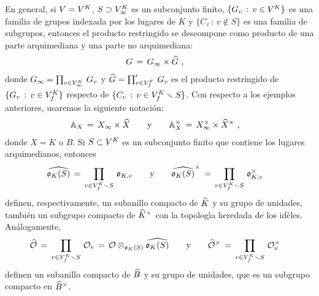 En general, si $V=\lugares{K}$, $S\supset\lugares[\infty]{K}$ es un subconjunto
finito, $\{G_{v}\,:\,v\in\lugares{K}\}$ es una familia de grupos indexada
por los lugares de $K$ y $\{C_{v}\,:\,v\not\in S\}$ es una familia de
subgrupos, entonces el producto restringido se descompone como producto de una
parte arquimediana y una parte no arquimediana:
\begin{align*}
	G & \,=\,\Adinf{G}\times \Adfin{G}
	\text{ ,}
\end{align*}
%
donde $\Adinf{G}=\prod_{v\in\lugares[\infty]{K}}\,G_{v}$ y
$\Adfin{G}=\prod_{v\in\lugares[f]{F}}'\,G_{v}$ es el producto restringido de
$\{G_{v}\,:\,v\in\lugares[f]{K}\}$ respecto de
$\{C_{v}\,:\,v\in\lugares[f]{K}\setmin S\}$. Con respecto a los ejemplos
anteriores, usaremos la siguiente notaci\'{o}n:
\begin{align*}
	\adeles{X}\,=\,\Adinf{X}\times\Adfin{X} & \qquad\text{y}\qquad
		\ideles{X}\,=\,\Idinf{X}\times\Idfin{X}
	\text{ ,}
\end{align*}
%
donde $X=K\text{ o }B$. Si $S\subset\lugares{K}$ es un subconjunto finito que
contiene los lugares arquimedianos, entonces
\begin{align*}
	\Adfin{\oka{K}(S)}\,=\,\prod_{v\in\lugares[f]{K}\setmin S}\,
		\oka{K,v} & \qquad\text{y}\qquad
	\Idfin{\oka{K}(S)}\,=\,\prod_{v\in\lugares[f]{K}\setmin S}\,
		\oka{K,v}^{\times}
\end{align*}
%
definen, respectivamente, un subanillo compacto de $\Adfin{K}$ y su grupo
de unidades, tambi\'{e}n un subgrupo compacto de $\Idfin{K}$ con la
topolog\'{\i}a heredada de los id\`{e}les. An\'{a}logamente,
\begin{align*}
	\Adfin{\cal{O}} \,=\,\prod_{v\in\lugares[f]{K}\setmin S}\,
		\cal{O}_{v} \,=\,\cal{O}\tensor[\oka{K}(S)]\Adfin{\oka{K}(S)}
		& \qquad\text{y}\qquad
	\Idfin{\cal{O}} \,=\,\prod_{v\in\lugares[f]{K}\setmin S}\,
		\cal{O}_{v}^{\times}
\end{align*}
%
definen un subanillo compacto de $\Adfin{B}$ y su grupo de unidades, que es un
subgrupo compacto en $\Idfin{B}$.
%
